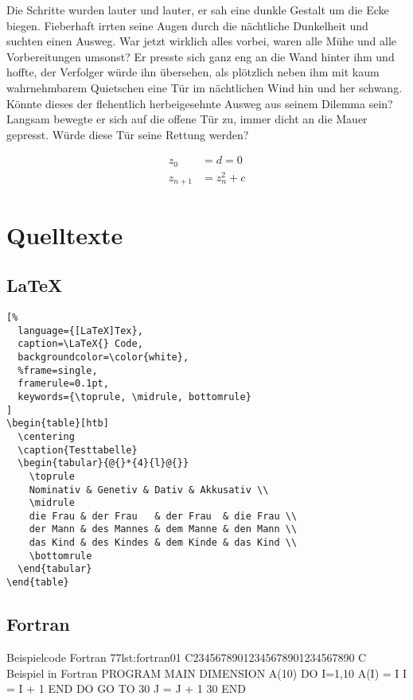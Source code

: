 Die Schritte wurden lauter und lauter, er sah eine dunkle Gestalt um die Ecke biegen. Fieberhaft irrten seine Augen durch die nächtliche Dunkelheit und suchten einen Ausweg. War jetzt wirklich alles vorbei, waren alle Mühe und alle Vorbereitungen umsonst? Er presste sich ganz eng an die Wand hinter ihm und hoffte, der Verfolger würde ihn übersehen, als plötzlich neben ihm mit kaum wahrnehmbarem Quietschen eine Tür im nächtlichen Wind hin und her schwang.\cite{Kuckuk1988} Könnte dieses der flehentlich herbeigesehnte Ausweg aus seinem Dilemma sein? Langsam bewegte er sich auf die offene Tür zu, immer dicht an die Mauer gepresst. Würde diese Tür seine Rettung werden?

\blindtext
\begin{align}
  z_0 &= d = 0 \\
  z_{n+1} &= z_n^2+c
\end{align}
\blindtext

\section{Quelltexte}
\blindtext

\subsection{\LaTeX}
\blindtext

\begin{lstlisting}[%
  language={[LaTeX]Tex},
  caption=\LaTeX{} Code,
  backgroundcolor=\color{white},
  %frame=single,
  framerule=0.1pt,
  keywords={\toprule, \midrule, bottomrule}
]
\begin{table}[htb]
  \centering
  \caption{Testtabelle}
  \begin{tabular}{@{}*{4}{l}@{}}
    \toprule
    Nominativ & Genetiv & Dativ & Akkusativ \\
    \midrule
    die Frau & der Frau   & der Frau  & die Frau \\
    der Mann & des Mannes & dem Manne & den Mann \\
    das Kind & des Kindes & dem Kinde & das Kind \\
    \bottomrule
  \end{tabular}
\end{table}
\end{lstlisting}

\subsection{Fortran}
\blindtext

\begin{fortran}{Beispielcode Fortran 77}{lst:fortran01}
C23456789012345678901234567890
C Beispiel in Fortran
      PROGRAM MAIN
      DIMENSION A(10)
      DO I=1,10
          A(I) = I
          I = I + 1
      END DO
      GO TO 30
      J = J + 1
30    END
\end{fortran}

\blindtext
